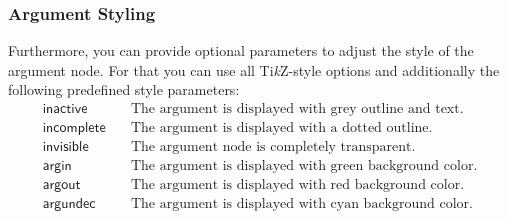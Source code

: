 \documentclass{article}
\newcommand{\tikzname}{Ti\emph{k}Z\xspace}
\begin{document}
\subsubsection{Argument Styling}
    Furthermore, you can provide optional parameters to adjust the style of the argument node.
    For that you can use all \tikzname-style options and additionally the following predefined style parameters:
    \begin{align*}
        \mathsf{inactive} &\quad \text{The argument is displayed with grey outline and text.}\\
        \mathsf{incomplete} &\quad \text{The argument is displayed with a dotted outline.}\\
        \mathsf{invisible} &\quad \text{The argument node is completely transparent.}\\
        \mathsf{argin} &\quad \text{The argument is displayed with green background color.}\\
        \mathsf{argout} &\quad \text{The argument is displayed with red background color.}\\
        \mathsf{argundec} &\quad \text{The argument is displayed with cyan background color.}\\
    \end{align*}

    
\end{document}
